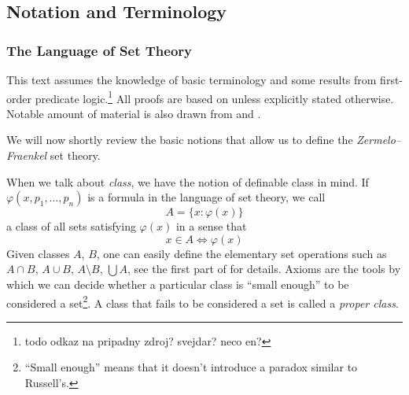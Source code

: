 \subsection{Notation and Terminology}
\subsubsection{The Language of Set Theory}
This text assumes the knowledge of basic terminology and some results from first-order predicate logic.\footnote{todo odkaz na pripadny zdroj? svejdar? neco en?} All proofs are based on \cite{JechBook} unless explicitly stated otherwise. Notable amount of material is also drawn from \cite{KanamoriBook} and \cite{DrakeBook}.

We will now shortly review the basic notions that allow us to define the \emph{Zermelo–Fraenkel} set theory.



When we talk about \emph{class}, we have the notion of definable class in mind. 
If $\varphi(x, p_1, \ldots, p_n)$ is a formula in the language of set theory, we call 
\begin{equation}
A = \{x : \varphi(x)\}
\end{equation}
a class of all sets satisfying $\varphi(x)$ in a sense that 
\begin{equation}
x \in A \iff \varphi(x)
\end{equation}
Given classes $A$, $B$, one can easily define the elementary set operations such as $A \cap B$, $A \cup B$, $A \setminus B$, $\bigcup A$, see the first part of \cite{JechBook} for details.
Axioms are the tools by which we can decide whether a particular class is ``small enough'' to be considered a set\footnote{``Small enough'' means that it doesn't introduce a paradox similar to Russell's.}. A class that fails to be considered a set is called a \emph{proper class}.

